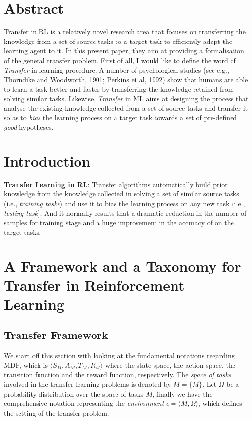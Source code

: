 \documentclass{article}
\begin{document}
\section{Abstract}
Transfer in RL is a relatively novel research area that focuses on transferring the knowledge from a set of source tasks to a target task to efficiently adapt the learning agent to it. In this present paper, they aim at providing a formalisation of the general transfer problem. First of all, I would like to define the word of \textit{Transfer} in learning procedure. A number of psychological studies (see e.g., Thorndike and Woodworth, 1901; Perkins et al, 1992) show that humans are able to learn a task better and faster by transferring the knowledge retained from solving similar tasks. Likewise, \textit{Transfer} in ML aims at designing the process that analyse the existing knowledge collected from a set of source tasks and transfer it so as to \textit{bias} the learning process on a target task towards a set of pre-defined \textit{good} hypotheses.

\section{Introduction}
\textbf{Transfer Learning in RL}: Transfer algorithms automatically build prior knowledge from the knowledge collected in solving a set of similar source tasks (i.e., \textit{training tasks}) and use it to bias the learning process on any new task (i.e., \textit{testing task}). And it normally results that a dramatic reduction in the number of samples for training stage and a huge improvement in the accuracy of on the target tasks.

\section{A Framework and a Taxonomy for Transfer in Reinforcement Learning}
\subsection{Transfer Framework}
We start off this section with looking at the fundamental notations regarding MDP, which is $\langle S_M, A_M, T_M, R_M \rangle$ where the state space, the action space, the transition function and the reward function, respectively. The \textit{space of tasks} involved in the transfer learning problems is denoted by $M = \{ M \}$. Let $\Omega$ be a probability distribution over the space of tasks $M$, finally we have the comprehensive notation representing the \textit{environment} $\epsilon = \langle M, \Omega \rangle$, which defines the setting of the transfer problem.
\end{document}
